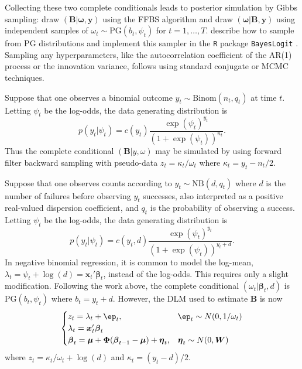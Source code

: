 \documentclass[12pt]{article}
\newcommand{\PG}{\text{PG}}
\newcommand{\NB}{\text{NB}}
\newcommand{\bbeta}{\boldsymbol{\beta}}
\newcommand{\oomega}{\boldsymbol{\omega}}
\newcommand{\yy}{\boldsymbol{y}}
\newcommand{\vx}{\boldsymbol{x}}
\newcommand{\betap}{{\boldsymbol{B}}}
\newcommand{\bW}{\boldsymbol{W}}
\newcommand{\bPhi}{\boldsymbol{\Phi}}
\newcommand{\bmu}{\boldsymbol{\mu}}
\newcommand{\veta}{\boldsymbol{\eta}}
\begin{document}
Collecting these two complete conditionals leads to posterior simulation by
Gibbs sampling: draw $(\betap|\oomega, \yy)$ using the FFBS algorithm and draw
$(\oomega | \betap, \yy)$ using independent samples of $\omega_t \sim \PG(b_t,
\psi_t)$ for $t=1, \ldots, T$.  \cite{polson-etal-2013} describe how to sample
from $\PG$ distributions and implement this sampler in the \texttt{R} package
\texttt{BayesLogit} \citep{bayeslogit-2013}.  Sampling any hyperparameters, like
the autocorrelation coefficient of the AR(1) process or the innovation variance,
follows using standard conjugate or MCMC techniques.

\begin{example}
  Suppose that one observes a binomial outcome $y_t \sim \text{Binom}(n_t, q_t)$
  at time $t$.  Letting $\psi_t$ be the log-odds, the data generating
  distribution is
  \[
  p(y_t | \psi_t) = c(y_t) \frac{\exp(\psi_t)^{y_t}}{(1+\exp({\psi_t}))^{n_t}}.
  \]
  Thus the complete conditional $(\betap | y, \omega)$ may be simulated by using
  forward filter backward sampling with pseudo-data $z_t = \kappa_t / \omega_t$
  where $\kappa_t = y_t - n_t / 2$.
\end{example}


\begin{example}
  Suppose that one observes counts according to $y_t \sim \NB(d, q_t)$ where $d$
  is the number of failures before observing $y_t$ successes, also interpreted
  as a positive real-valued dispersion coefficient, and $q_t$ is the probability
  of observing a success.  Letting $\psi_t$ be the log-odds, the data generating
  distribution is
  \[
  p(y_t | \psi_t) = c(y_t, d) \frac{\exp({\psi_t})^{y_t}}{(1+\exp({\psi_t}))^{y_t+d}}.
  \]
  In negative binomial regression, it is common to model the log-mean, $\lambda_t
  = \psi_t + \log(d) = \vx_t' \bbeta_t$, instead of the log-odds.  This requires only
  a slight modification.  Following the work above, the complete conditional
  $(\omega_t | \bbeta_t, d)$ is $\PG(b_t, \psi_t)$ where $b_t = y_t + d$.  However,
  the DLM used to estimate $\betap$ is now
  \[
  \begin{cases}
    z_t = \lambda_t + \ep_t, & \ep_t \sim N(0, 1/\omega_t) \\
    \lambda_t = \vx_t' \bbeta_t \\
    \bbeta_t = \bmu + \bPhi (\bbeta_{t-1} - \bmu) + \veta_t, & \veta_t \sim N(0, \bW)
  \end{cases}
  \]
  where $z_t = \kappa_t / \omega_t + \log(d)$ and $\kappa_t = (y_t - d) / 2$.
\end{example}
\end{document}
